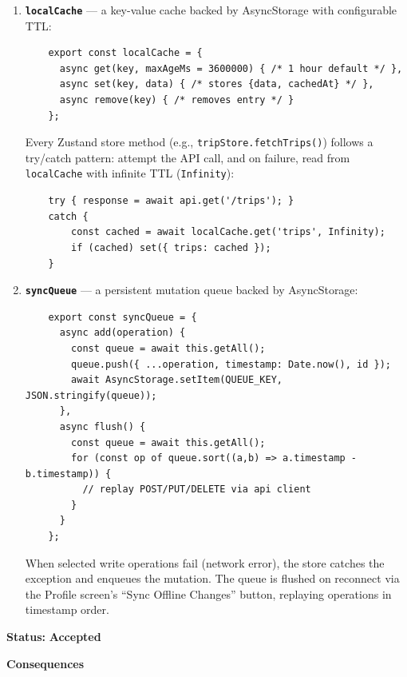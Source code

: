 \documentclass[12pt, a4paper]{article}
\newcommand{\code}[1]{\texttt{\small #1}}
\newcommand{\adrstatus}[1]{\textcolor{adrstatus}{\textbf{#1}}}
\begin{document}
\begin{tcolorbox}[adrbox]
\begin{enumerate}
  \item \textbf{\code{localCache}} --- a key-value cache backed by AsyncStorage with configurable TTL:
  \begin{verbatim}
    export const localCache = {
      async get(key, maxAgeMs = 3600000) { /* 1 hour default */ },
      async set(key, data) { /* stores {data, cachedAt} */ },
      async remove(key) { /* removes entry */ }
    };
  \end{verbatim}
  Every Zustand store method (e.g., \code{tripStore.fetchTrips()}) follows a try/catch pattern: attempt the API call, and on failure, read from \code{localCache} with infinite TTL (\code{Infinity}):
  \begin{verbatim}
    try { response = await api.get('/trips'); }
    catch {
        const cached = await localCache.get('trips', Infinity);
        if (cached) set({ trips: cached });
    }
  \end{verbatim}

  \item \textbf{\code{syncQueue}} --- a persistent mutation queue backed by AsyncStorage:
  \begin{verbatim}
    export const syncQueue = {
      async add(operation) {
        const queue = await this.getAll();
        queue.push({ ...operation, timestamp: Date.now(), id });
        await AsyncStorage.setItem(QUEUE_KEY, JSON.stringify(queue));
      },
      async flush() {
        const queue = await this.getAll();
        for (const op of queue.sort((a,b) => a.timestamp - b.timestamp)) {
          // replay POST/PUT/DELETE via api client
        }
      }
    };
  \end{verbatim}
  When selected write operations fail (network error), the store catches the exception and enqueues the mutation. The queue is flushed on reconnect via the Profile screen's ``Sync Offline Changes'' button, replaying operations in timestamp order.
\end{enumerate}

\vspace{0.6em}
\textbf{Status:} \adrstatus{Accepted}

\vspace{0.6em}
\textbf{Consequences}


\end{tcolorbox}
\end{document}
